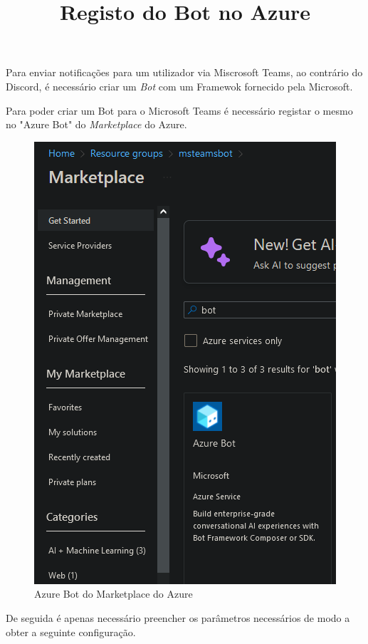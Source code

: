 Para enviar notificações para um utilizador via Miscrosoft Teams, ao contrário do Discord,
é necessário criar um \textit{Bot} com um Framewok fornecido pela Microsoft.


\title*{\textbf{Registo do Bot no Azure}}

Para poder criar um Bot para o Microsoft Teams é necessário registar o mesmo 
no "Azure Bot" do \textit{Marketplace} do Azure.

\begin{figure}[H]
\begin{center}
\includegraphics[width=14cm]{figs/marketplace azure bot.png}
\caption{Azure Bot do Marketplace do Azure}
\label{fig:bookstack}
\end{center}
\end{figure}

De seguida é apenas necessário preencher os parâmetros necessários de modo a obter
a seguinte configuração.

